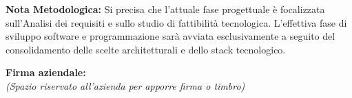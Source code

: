 \documentclass[a4paper,12pt]{article}
\begin{document}
\textbf{Nota Metodologica:} Si precisa che l'attuale fase progettuale è focalizzata sull'Analisi dei requisiti e sullo studio di fattibilità tecnologica. L'effettiva fase di sviluppo software e programmazione sarà avviata esclusivamente a seguito del consolidamento delle scelte architetturali e dello stack tecnologico.

\vspace*{\fill}
\noindent
\begin{minipage}{0.60\textwidth}
    {\small
    \textbf{Firma aziendale:}\\[0.3cm]
    \textit{(Spazio riservato all’azienda per apporre firma o timbro)}\\[0.8cm]
    \fbox{\rule{0pt}{2.5cm}\rule{5cm}{0pt}} 
    }
\end{minipage}
\end{document}

